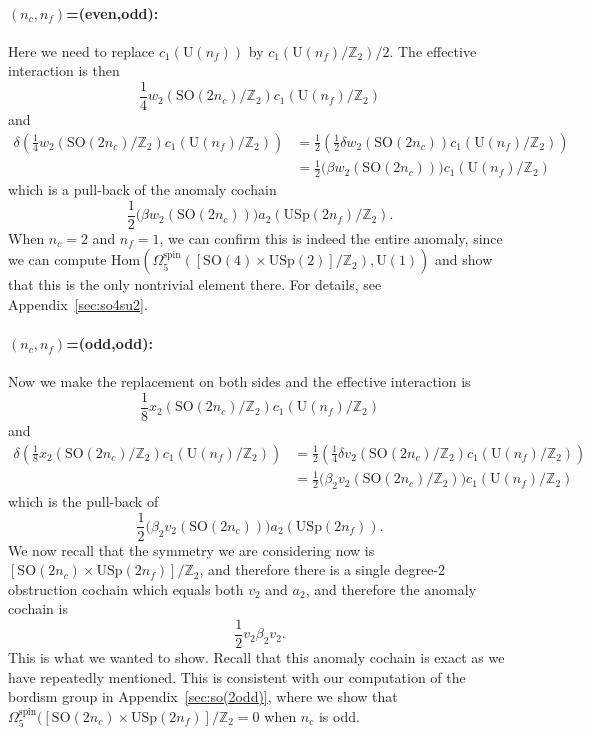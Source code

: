 \documentclass[12pt]{article}
\numberwithin{equation}{section}
\def\bZ{\mathbb{Z}}
\def\U{\mathrm{U}}
\def\SO{\mathrm{SO}}
\def\USp{\mathrm{USp}}
\begin{document}
\paragraph{$(n_c,n_f)$=(even,odd):}
Here we need to replace $c_1(\U(n_f))$ by $c_1(\U(n_f)/\bZ_2)/2$.
The effective interaction is then \begin{equation}
\frac14 w_2(\SO(2n_c)/\bZ_2) c_1(\U(n_f)/\bZ_2) 
\end{equation} and \begin{align}
\delta\left(\frac14 w_2(\SO(2n_c)/\bZ_2) c_1(\U(n_f)/\bZ_2) \right)
&= \frac12 \left(\frac12\delta w_2(\SO(2n_c)) c_1(\U(n_f)/\bZ_2) \right) \\
&= \frac12 \Big(\beta w_2(\SO(2n_c))\Big)c_1(\U(n_f)/\bZ_2) 
\end{align}
which is a pull-back of the anomaly cochain
\begin{equation}
 \frac12 \Big(\beta w_2(\SO(2n_c))\Big)a_2(\USp(2n_f)/\bZ_2). 
\end{equation}
When $n_c=2$ and $n_f=1$, we can confirm this is indeed the entire anomaly,
since we can compute $\mathrm{Hom}(\Omega^\text{spin}_5([\SO(4)\times \USp(2)]/\bZ_2),\U(1))$
and show that this is the only nontrivial element there.
For details, see Appendix~\ref{sec:so4su2}.

\paragraph{$(n_c,n_f)$=(odd,odd):}
Now we make the replacement on both sides and the effective interaction is \begin{equation}
\frac18 x_2(\SO(2n_c)/\bZ_2) c_1(\U(n_f)/\bZ_2) 
\end{equation}
and \begin{align}
\delta\left(\frac18 x_2(\SO(2n_c)/\bZ_2) c_1(\U(n_f)/\bZ_2) \right)
&= \frac12 \left(\frac14\delta v_2(\SO(2n_c)/\bZ_2) c_1(\U(n_f)/\bZ_2) \right) \\
&= \frac12 \Big(\beta_2 v_2(\SO(2n_c)/\bZ_2)\Big)c_1(\U(n_f)/\bZ_2) 
\end{align}
which is the pull-back of \begin{equation}
 \frac12 \Big(\beta_2 v_2(\SO(2n_c))\Big)a_2(\USp(2n_f)).
\end{equation}
We now recall that the symmetry we are considering now is $[\SO(2n_c)\times \USp(2n_f)]/\bZ_2$,
and therefore there is a single degree-2 obstruction cochain which equals both $v_2$ and $a_2$,
and therefore the anomaly cochain is \begin{equation}
 \frac12 v_2\beta_2 v_2.
\end{equation}
This is what we wanted to show.
Recall that this anomaly cochain is exact as we have repeatedly mentioned.
This is consistent with our computation of the bordism group in Appendix~\ref{sec:so(2odd)},
where we show that $\Omega^\text{spin}_5([\SO(2n_c)\times \USp(2n_f)]/\bZ_2=0$ when $n_c$ is odd.
\end{document}
